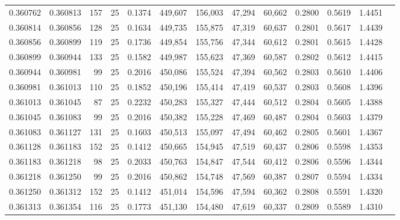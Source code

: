 \begin{tabular}{rrrrrrrrrrrrr}
0.360762 & 0.360813 &   157 &  25 &                                     0.1374 & 449,607 & 156,003 &  47,294 &  60,662 & 0.2800 & 0.5619 & 1.4451 \\
0.360814 & 0.360856 &   128 &  25 &                                     0.1634 & 449,735 & 155,875 &  47,319 &  60,637 & 0.2801 & 0.5617 & 1.4439 \\
0.360856 & 0.360899 &   119 &  25 &                                     0.1736 & 449,854 & 155,756 &  47,344 &  60,612 & 0.2801 & 0.5615 & 1.4428 \\
0.360899 & 0.360944 &   133 &  25 &                                     0.1582 & 449,987 & 155,623 &  47,369 &  60,587 & 0.2802 & 0.5612 & 1.4415 \\
0.360944 & 0.360981 &    99 &  25 &                                     0.2016 & 450,086 & 155,524 &  47,394 &  60,562 & 0.2803 & 0.5610 & 1.4406 \\
0.360981 & 0.361013 &   110 &  25 &                                     0.1852 & 450,196 & 155,414 &  47,419 &  60,537 & 0.2803 & 0.5608 & 1.4396 \\
0.361013 & 0.361045 &    87 &  25 &                                     0.2232 & 450,283 & 155,327 &  47,444 &  60,512 & 0.2804 & 0.5605 & 1.4388 \\
0.361045 & 0.361083 &    99 &  25 &                                     0.2016 & 450,382 & 155,228 &  47,469 &  60,487 & 0.2804 & 0.5603 & 1.4379 \\
0.361083 & 0.361127 &   131 &  25 &                                     0.1603 & 450,513 & 155,097 &  47,494 &  60,462 & 0.2805 & 0.5601 & 1.4367 \\
0.361128 & 0.361183 &   152 &  25 &                                     0.1412 & 450,665 & 154,945 &  47,519 &  60,437 & 0.2806 & 0.5598 & 1.4353 \\
0.361183 & 0.361218 &    98 &  25 &                                     0.2033 & 450,763 & 154,847 &  47,544 &  60,412 & 0.2806 & 0.5596 & 1.4344 \\
0.361218 & 0.361250 &    99 &  25 &                                     0.2016 & 450,862 & 154,748 &  47,569 &  60,387 & 0.2807 & 0.5594 & 1.4334 \\
0.361250 & 0.361312 &   152 &  25 &                                     0.1412 & 451,014 & 154,596 &  47,594 &  60,362 & 0.2808 & 0.5591 & 1.4320 \\
0.361313 & 0.361354 &   116 &  25 &                                     0.1773 & 451,130 & 154,480 &  47,619 &  60,337 & 0.2809 & 0.5589 & 1.4310 \\

\end{tabular}
